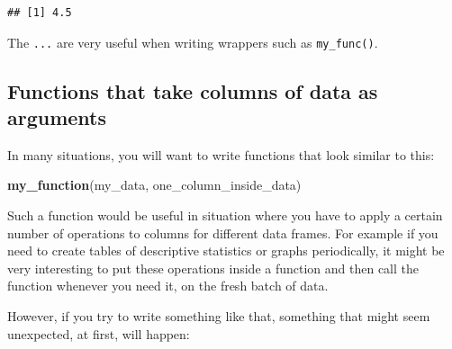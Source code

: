 \documentclass[]{gitbook}
\newenvironment{Shaded}{\begin{snugshade}}{\end{snugshade}}
\newcommand{\ControlFlowTok}[1]{\textcolor[rgb]{0.13,0.29,0.53}{\textbf{#1}}}
\newcommand{\DataTypeTok}[1]{\textcolor[rgb]{0.13,0.29,0.53}{#1}}
\newcommand{\KeywordTok}[1]{\textcolor[rgb]{0.13,0.29,0.53}{\textbf{#1}}}
\newcommand{\NormalTok}[1]{#1}
\newcommand{\OperatorTok}[1]{\textcolor[rgb]{0.81,0.36,0.00}{\textbf{#1}}}
\newcommand{\StringTok}[1]{\textcolor[rgb]{0.31,0.60,0.02}{#1}}
\begin{document}
\begin{verbatim}
## [1] 4.5
\end{verbatim}

The \texttt{...} are very useful when writing wrappers such as \texttt{my\_func()}.

\hypertarget{functions-that-take-columns-of-data-as-arguments}{%
\subsection{Functions that take columns of data as arguments}\label{functions-that-take-columns-of-data-as-arguments}}

In many situations, you will want to write functions that look similar to this:

\begin{Shaded}
\begin{Highlighting}[]
\KeywordTok{my_function}\NormalTok{(my_data, one_column_inside_data)}
\end{Highlighting}
\end{Shaded}

Such a function would be useful in situation where you have to apply a certain number of operations
to columns for different data frames. For example if you need to create tables of descriptive
statistics or graphs periodically, it might be very interesting to put these operations inside a
function and then call the function whenever you need it, on the fresh batch of data.

However, if you try to write something like that, something that might seem unexpected, at first,
will happen:

\begin{Shaded}
\end{Shaded}
\end{document}
